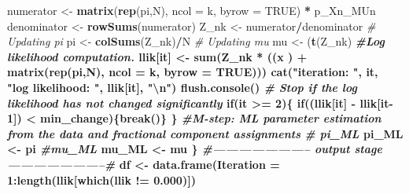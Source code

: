 \documentclass[]{article}
\newenvironment{Shaded}{\begin{snugshade}}{\end{snugshade}}
\newcommand{\KeywordTok}[1]{\textcolor[rgb]{0.13,0.29,0.53}{\textbf{#1}}}
\newcommand{\DataTypeTok}[1]{\textcolor[rgb]{0.13,0.29,0.53}{#1}}
\newcommand{\DecValTok}[1]{\textcolor[rgb]{0.00,0.00,0.81}{#1}}
\newcommand{\FloatTok}[1]{\textcolor[rgb]{0.00,0.00,0.81}{#1}}
\newcommand{\CharTok}[1]{\textcolor[rgb]{0.31,0.60,0.02}{#1}}
\newcommand{\StringTok}[1]{\textcolor[rgb]{0.31,0.60,0.02}{#1}}
\newcommand{\CommentTok}[1]{\textcolor[rgb]{0.56,0.35,0.01}{\textit{#1}}}
\newcommand{\OtherTok}[1]{\textcolor[rgb]{0.56,0.35,0.01}{#1}}
\newcommand{\ControlFlowTok}[1]{\textcolor[rgb]{0.13,0.29,0.53}{\textbf{#1}}}
\newcommand{\OperatorTok}[1]{\textcolor[rgb]{0.81,0.36,0.00}{\textbf{#1}}}
\newcommand{\NormalTok}[1]{#1}
\begin{document}
\begin{Shaded}
\begin{Highlighting}[]
{\NormalTok{numerator <-}\StringTok{ }\KeywordTok{matrix}\NormalTok{(}\KeywordTok{rep}\NormalTok{(pi,N), }\DataTypeTok{ncol =}\NormalTok{ k, }\DataTypeTok{byrow =} \OtherTok{TRUE}\NormalTok{) }\OperatorTok{*}\StringTok{ }\NormalTok{p_Xn_MUn}
\NormalTok{denominator <-}\StringTok{ }\KeywordTok{rowSums}\NormalTok{(numerator)}
\NormalTok{Z_nk <-}\StringTok{ }\NormalTok{numerator}\OperatorTok{/}\NormalTok{denominator}
\CommentTok{# Updating pi}
\NormalTok{pi <-}\StringTok{ }\KeywordTok{colSums}\NormalTok{(Z_nk)}\OperatorTok{/}\NormalTok{N}
\CommentTok{# Updating mu}
\NormalTok{mu <-}\StringTok{ }\NormalTok{(}\KeywordTok{t}\NormalTok{(Z_nk) }\OperatorTok{%*%}\StringTok{ }\NormalTok{x)}\OperatorTok{/}\KeywordTok{colSums}\NormalTok{(Z_nk)}
\CommentTok{#Log likelihood computation.}
\NormalTok{llik[it] <-}\StringTok{ }\KeywordTok{sum}\NormalTok{(Z_nk }\OperatorTok{*}\StringTok{ }\NormalTok{((x }\OperatorTok{%*%}\StringTok{ }\KeywordTok{log}\NormalTok{(}\KeywordTok{t}\NormalTok{(mu)) }\OperatorTok{+}\StringTok{ }\NormalTok{(}\DecValTok{1} \OperatorTok{-}\StringTok{ }\NormalTok{x) }\OperatorTok{%*%}\StringTok{ }\KeywordTok{log}\NormalTok{(}\DecValTok{1} \OperatorTok{-}\StringTok{ }\KeywordTok{t}\NormalTok{(mu))}
\NormalTok{) }\OperatorTok{+}\StringTok{ }\KeywordTok{matrix}\NormalTok{(}\KeywordTok{rep}\NormalTok{(pi,N), }\DataTypeTok{ncol =}\NormalTok{ k, }\DataTypeTok{byrow =} \OtherTok{TRUE}\NormalTok{)))}
\KeywordTok{cat}\NormalTok{(}\StringTok{"iteration: "}\NormalTok{, it, }\StringTok{"log likelihood: "}\NormalTok{, llik[it], }\StringTok{"}\CharTok{\textbackslash{}n}\StringTok{"}\NormalTok{)}
\KeywordTok{flush.console}\NormalTok{()}
\CommentTok{# Stop if the log likelihood has not changed significantly}
\ControlFlowTok{if}\NormalTok{(it }\OperatorTok{>=}\StringTok{ }\DecValTok{2}\NormalTok{)\{}
\ControlFlowTok{if}\NormalTok{((llik[it] }\OperatorTok{-}\StringTok{ }\NormalTok{llik[it}\OperatorTok{-}\DecValTok{1}\NormalTok{]) }\OperatorTok{<}\StringTok{ }\NormalTok{min_change)\{}\ControlFlowTok{break}\NormalTok{()\}}
\NormalTok{\}}
\CommentTok{#M-step: ML parameter estimation from the data and fractional component assignments}
\CommentTok{# pi_ML}
\NormalTok{pi_ML <-}\StringTok{ }\NormalTok{pi}
\CommentTok{#mu_ML}
\NormalTok{mu_ML <-}\StringTok{ }\NormalTok{mu}
\NormalTok{\}}
\CommentTok{#----------------------- output stage -----------------------#}
\NormalTok{df <-}\StringTok{ }\KeywordTok{data.frame}\NormalTok{(}\DataTypeTok{Iteration =} \DecValTok{1}\OperatorTok{:}\KeywordTok{length}\NormalTok{(llik[}\KeywordTok{which}\NormalTok{(llik }\OperatorTok{!=}\StringTok{ }\FloatTok{0.000}\NormalTok{)])}
}}}
\end{Highlighting}
\end{Shaded}
\end{document}
